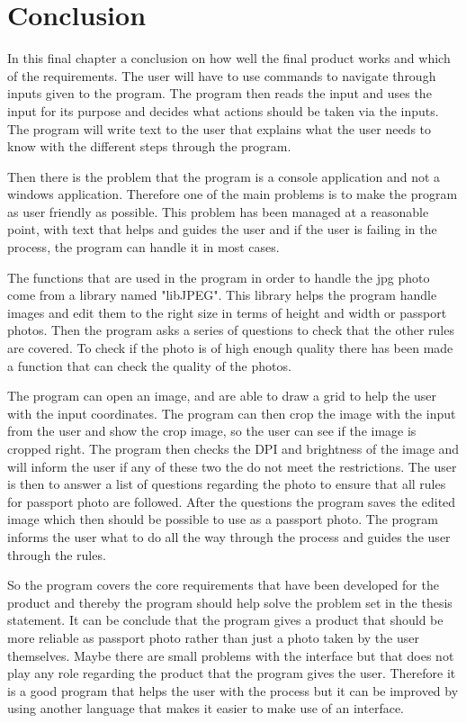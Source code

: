 \chapter{Conclusion}
In this final chapter a conclusion on how well the final product works and which of the requirements.
The user will have to use commands to navigate through inputs given to the program. The program then reads the input and uses the input for its purpose and decides what actions should be taken via the inputs. The program will write text to the user that explains what the user needs to know with the different steps through the program.

Then there is the problem that the program is a console application and not a windows application. Therefore one of the main problems is to make the program as user friendly as possible. This problem has been managed at a reasonable point, with text that helps and guides the user and if the user is failing in the process, the program can handle it in most cases.

The functions that are used in the program in order to handle the jpg photo come from a library named "libJPEG". This library helps the program handle images and edit them to the right size in terms of height and width or passport photos. Then the program asks a series of questions to check that the other rules are covered. To check if the photo is of high enough quality there has been made a function that can check the quality of the photos.

The program can open an image, and are able to draw a grid to help the user with the input coordinates. The program can then crop the image with the input from the user and show the crop image, so the user can see if the image is cropped right.
The program then checks the DPI and brightness of the image and will inform the user if any of these two the do not meet the restrictions. The user is then to answer a list of questions regarding the photo to ensure that all rules for passport photo are followed.
After the questions the program saves the edited image which then should be possible to use as a passport photo. The program informs the user what to do all the way through the process and guides the user through the rules.

So the program covers the core requirements that have been developed for the product and thereby the program should help solve the problem set in the thesis statement. 
It can be conclude that the program gives a product that should be more reliable as passport photo rather than just a photo taken by the user themselves.
Maybe there are small problems with the interface but that does not play any role regarding the product that the program gives the user.
Therefore it is a good program that helps the user with the process but it can be improved by using another language that makes it easier to make use of an interface.